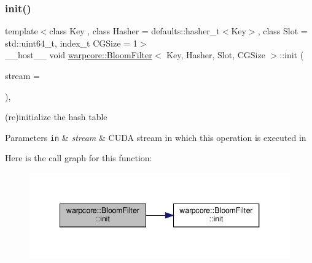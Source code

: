 \subsubsection{\texorpdfstring{init()}{init()}\hspace{0.1cm}{\footnotesize\ttfamily [2/2]}}
{\footnotesize\ttfamily template$<$class Key , class Hasher  = defaults\+::hasher\+\_\+t$<$\+Key$>$, class Slot  = std\+::uint64\+\_\+t, index\+\_\+t C\+G\+Size = 1$>$ \\
\+\_\+\+\_\+host\+\_\+\+\_\+ void \hyperlink{classwarpcore_1_1BloomFilter}{warpcore\+::\+Bloom\+Filter}$<$ Key, Hasher, Slot, C\+G\+Size $>$\+::init (\begin{DoxyParamCaption}\item[{const cuda\+Stream\+\_\+t}]{stream = {} }\end{DoxyParamCaption})\hspace{0.3cm}{\ttfamily [inline]}, {\ttfamily [noexcept]}}



(re)initialize the hash table 


\begin{DoxyParams}[1]{Parameters}
\mbox{\tt in}  & {\em stream} & C\+U\+DA stream in which this operation is executed in \\
\hline
\end{DoxyParams}
Here is the call graph for this function\+:
\nopagebreak
\begin{figure}[H]
\begin{center}
\leavevmode
\includegraphics[width=340pt]{classwarpcore_1_1BloomFilter_a33d24a1ae65b9a798107bd936989bf40_cgraph}
\end{center}
\end{figure}
\mbox{\label{classwarpcore_1_1BloomFilter_a4b3151a938a8248df22adbdefd63b8e0}} 
